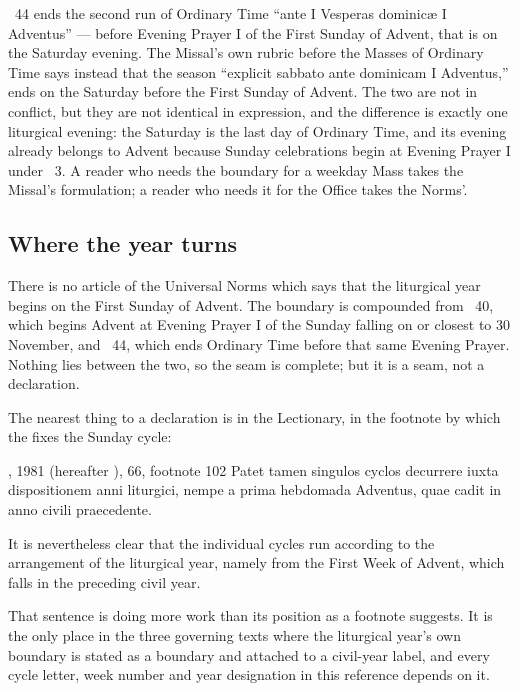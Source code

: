 ~44 ends the second run of Ordinary Time ``ante I Vesperas dominicæ I Adventus'' --- before
Evening Prayer I of the First Sunday of Advent, that is on the Saturday evening. The Missal's own
rubric before the Masses of Ordinary Time says instead that the season ``explicit sabbato ante
dominicam I Adventus,'' ends on the Saturday before the First Sunday of Advent. The two are not in
conflict, but they are not identical in expression, and the difference is exactly one liturgical
evening: the Saturday is the last day of Ordinary Time, and its evening already belongs to Advent
because Sunday celebrations begin at Evening Prayer I under ~3. A reader who needs the
boundary for a weekday Mass takes the Missal's formulation; a reader who needs it for the Office
takes the Norms'.

\subsection{Where the year turns}
\label{sec:turn}

There is no article of the Universal Norms which says that the liturgical year begins on the First
Sunday of Advent. The boundary is compounded from ~40, which begins Advent at Evening
Prayer I of the Sunday falling on or closest to 30 November, and ~44, which ends Ordinary
Time before that same Evening Prayer. Nothing lies between the two, so the seam is complete; but it
is a seam, not a declaration.

The nearest thing to a declaration is in the Lectionary, in the footnote by which the  fixes the Sunday cycle:

\begin{normtext}{, 1981  (hereafter ),  66, footnote 102}
Patet tamen singulos cyclos decurrere iuxta dispositionem anni liturgici, nempe a prima hebdomada
Adventus, quae cadit in anno civili praecedente.
\end{normtext}

\begin{workingrendering}
It is nevertheless clear that the individual cycles run according to the arrangement of the
liturgical year, namely from the First Week of Advent, which falls in the preceding civil year.
\end{workingrendering}

That sentence is doing more work than its position as a footnote suggests. It is the only place in
the three governing texts where the liturgical year's own boundary is stated as a boundary and
attached to a civil-year label, and every cycle letter, week number and year designation in this
reference depends on it.

